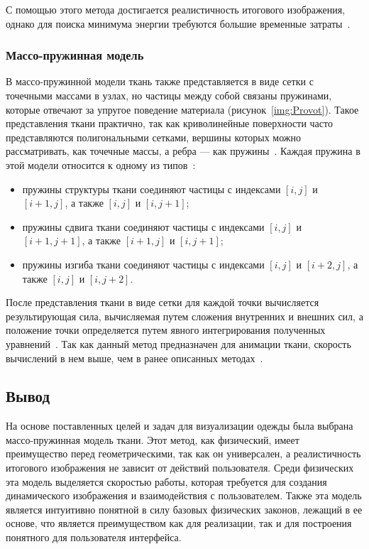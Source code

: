 С помощью этого метода достигается реалистичность итогового изображения, однако
для поиска минимума энергии требуются большие временные затраты~\cite{bib11}.

\subsubsection{Массо-пружинная модель}

В массо-пружинной модели ткань также представляется в виде сетки с точечными
массами в узлах, но частицы между собой связаны пружинами, которые отвечают за
упругое поведение материала (рисунок~\ref{img:Provot}). Такое представления
ткани практично, так как криволинейные поверхности часто представляются
полигональными сетками, вершины которых можно рассматривать, как точечные массы,
а ребра --- как пружины~\cite{bib15}. Каждая пружина в этой модели относится к
одному из типов~\cite{bib14}:
\begin{itemize}[left=\parindent]
    \item пружины структуры ткани соединяют частицы с индексами $[i,j]$
        и $[i+1,j]$, а также $[i,j]$ и $[i, j+1]$;
    \item пружины сдвига ткани соединяют частицы с индексами $[i,j]$ и
        $[i+1,j+1]$, а также $[i+1,j]$ и $[i, j+1]$;
    \item пружины изгиба ткани соединяют частицы с индексами $[i,j]$ и
        $[i+2,j]$, а также $[i,j]$ и $[i, j+2]$.
\end{itemize}


После представления ткани в виде сетки для каждой точки вычисляется
результирующая сила, вычисляемая путем сложения внутренних и внешних сил, а
положение точки определяется путем явного интегрирования полученных
уравнений~\cite{bib11}. Так как данный метод предназначен для анимации ткани,
скорость вычислений в нем выше, чем в ранее описанных методах~\cite{bib14}.

\subsection*{Вывод}

На основе поставленных целей и задач для визуализации одежды была выбрана
массо-пружинная модель ткани. Этот метод, как физический, имеет преимущество
перед геометрическими, так как он универсален, а реалистичность итогового
изображения не зависит от действий пользователя. Среди физических эта модель
выделяется скоростью работы, которая требуется для создания динамического
изображения и взаимодействия с пользователем. Также эта модель является
интуитивно понятной в силу базовых физических законов, лежащий в ее основе, что
является преимуществом как для реализации, так и для построения понятного для
пользователя интерфейса.

